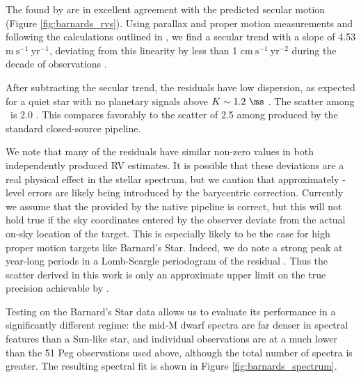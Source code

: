 \documentclass[modern]{aastex62}
\newcommand{\Mdwarf}{Barnard's Star\xspace} %
\begin{document}
The \RVs found by \wobble are in excellent agreement with the predicted secular motion (Figure \ref{fig:barnards_rvs}). 
Using \gaia parallax and proper motion measurements and following the calculations outlined in \citet{Kurster2003}, we find a secular trend with a slope of 4.53 $\mathrm{m}~\mathrm{s}^{-1}~\mathrm{yr}^{-1}$, deviating from this linearity by less than 1 $\mathrm{cm}~\mathrm{s}^{-1}~\mathrm{yr}^{-2}$ during the decade of \HARPS observations \citep{gaia2016, gaia2018}. 

After subtracting the secular \RV trend, the residuals have low dispersion, as expected for a quiet star with no planetary signals above $K \sim 1.2~\ms$ \citep{Choi2013, Ribas2018}. 
The  scatter among \wobble\ \RVs is 2.0 \ms. 
This compares favorably to the scatter of 2.5 \ms among \RVs produced by the standard closed-source \HARPS pipeline. 

We note that many of the residuals have similar non-zero values in both independently produced RV estimates. 
It is possible that these deviations are a real physical effect in the stellar spectrum, but we caution that approximately \ms-level errors are likely being introduced by the barycentric correction. 
Currently we assume that the \BERV provided by the native \HARPS pipeline is correct, but this will not hold true if the sky coordinates entered by the observer deviate from the actual on-sky location of the target. 
This is especially likely to be the case for high proper motion targets like \Mdwarf. 
Indeed, we do note a strong peak at year-long periods in a Lomb-Scargle periodogram of the residual \RVs. 
Thus the \RV scatter derived in this work is only an approximate upper limit on the true precision achievable by \wobble. 

Testing \wobble on the \Mdwarf data allows us to evaluate its performance in a significantly different regime: the mid-M dwarf spectra are far denser in spectral features than a Sun-like star, and individual observations are at a much lower \SNR than the 51 Peg observations used above, although the total number of spectra is greater. 
The resulting spectral fit is shown in Figure \ref{fig:barnards_spectrum}.
\end{document}
